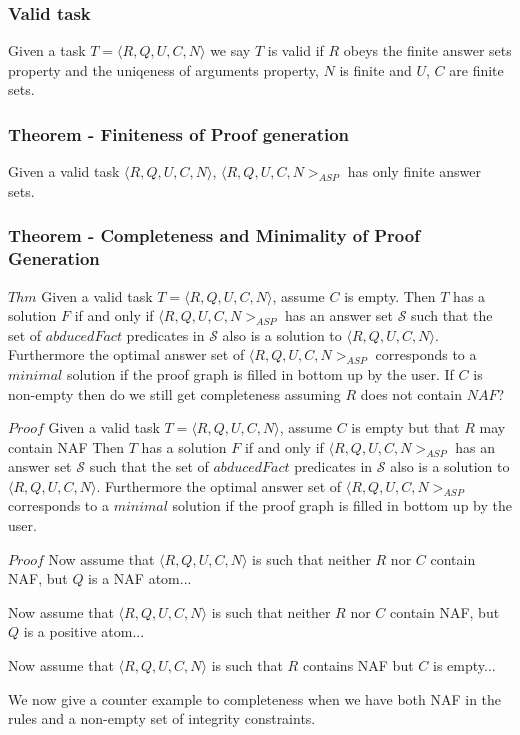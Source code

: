 \documentclass[sigconf]{acmart}
\begin{document}
\subsubsection{Valid task}
Given a task $T = \langle R,Q,U,C,N\rangle$ we say $T$ is valid if $R$ obeys the finite answer sets property and the uniqeness of arguments property, $N$ is finite and $U$, $C$ are finite sets. 

\subsubsection{Theorem - Finiteness of Proof generation}
Given a valid task $\langle R,Q,U,C,N\rangle$, $\langle R,Q,U,C,N>_{ASP}$ has only finite answer sets. 

\subsubsection{Theorem - Completeness and Minimality of Proof Generation}
$Thm$ Given a valid task $T= \langle R,Q,U,C,N\rangle$, assume $C$ is empty. Then $T$ has a solution $F$ if and only if $\langle R,Q,U,C,N>_{ASP}$ has an answer set $\mathcal{S}$ such that the set of $abducedFact$ predicates in $\mathcal{S}$ also is a solution to $\langle R,Q,U,C,N\rangle$. Furthermore the optimal answer set of $\langle R,Q,U,C,N>_{ASP}$ corresponds to a $minimal$ solution if the proof graph is filled in bottom up by the user. If $C$ is non-empty then do we still get completeness assuming $R$ does not contain $NAF$?

$Proof$
Given a valid task $T= \langle R,Q,U,C,N\rangle$, assume $C$ is empty but that $R$ may contain NAF Then $T$ has a solution $F$ if and only if $\langle R,Q,U,C,N>_{ASP}$ has an answer set $\mathcal{S}$ such that the set of $abducedFact$ predicates in $\mathcal{S}$ also is a solution to $\langle R,Q,U,C,N\rangle$. Furthermore the optimal answer set of $\langle R,Q,U,C,N>_{ASP}$ corresponds to a $minimal$ solution if the proof graph is filled in bottom up by the user.

$Proof$ Now assume that $\langle R,Q,U,C,N\rangle$ is such that neither $R$ nor $C$ contain NAF, but $Q$ is a NAF atom...

Now assume that $\langle R,Q,U,C,N\rangle$ is such that neither $R$ nor $C$ contain NAF, but $Q$ is a positive atom...

Now assume that $\langle R,Q,U,C,N\rangle$ is such that $R$ contains NAF but $C$ is empty...

We now give a counter example to completeness when we have both NAF in the rules and a non-empty set of integrity constraints.
\end{document}

